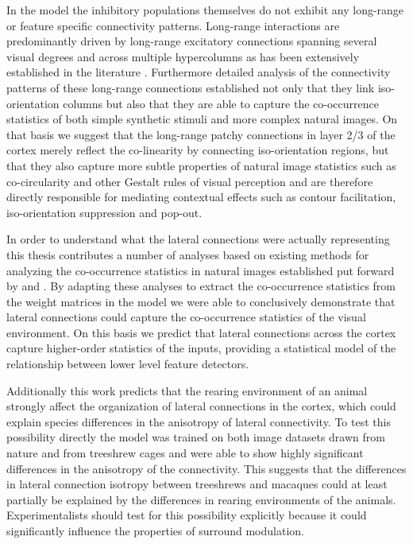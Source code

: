 In the model the inhibitory populations themselves do not exhibit any
long-range or feature specific connectivity patterns. Long-range
interactions are predominantly driven by long-range excitatory
connections spanning several visual degrees and across multiple
hypercolumns as has been extensively established in the literature
\citep{Weliky1995, Bair2003}. Furthermore detailed analysis of the
connectivity patterns of these long-range connections established not
only that they link iso-orientation columns but also that they are
able to capture the co-occurrence statistics of both simple synthetic
stimuli and more complex natural images. On that basis we suggest that
the long-range patchy connections in layer 2/3 of the cortex merely
reflect the co-linearity by connecting iso-orientation regions, but
that they also capture more subtle properties of natural image
statistics such as co-circularity and other Gestalt rules of visual
perception and are therefore directly responsible for mediating
contextual effects such as contour facilitation, iso-orientation
suppression and pop-out.

In order to understand what the lateral connections were actually
representing this thesis contributes a number of analyses based on
existing methods for analyzing the co-occurrence statistics in natural
images established put forward by \cite{Geisler2001} and
\cite{Perrinet2015}. By adapting these analyses to extract the
co-occurrence statistics from the weight matrices in the model we were
able to conclusively demonstrate that lateral connections could
capture the co-occurrence statistics of the visual environment. On
this basis we predict that lateral connections across the cortex
capture higher-order statistics of the inputs, providing a statistical
model of the relationship between lower level feature detectors.

Additionally this work predicts that the rearing environment of an
animal strongly affect the organization of lateral connections in the
cortex, which could explain species differences in the anisotropy of
lateral connectivity. To test this possibility directly the model was
trained on both image datasets drawn from nature and from treeshrew
cages and were able to show highly significant differences in the
anisotropy of the connectivity. This suggests that the differences in
lateral connection isotropy between treeshrews \citep{Bosking1997} and
macaques \citep{Angelucci2002} could at least partially be explained
by the differences in rearing environments of the
animals. Experimentalists should test for this possibility explicitly
because it could significantly influence the properties of surround
modulation.

